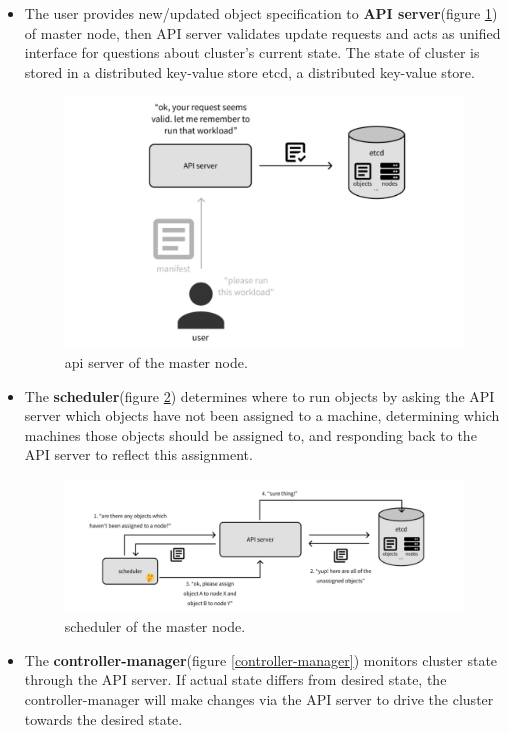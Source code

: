 \begin{itemize}
   \item The user provides new/updated object specification to \textbf{API server}(figure \ref{api-server}) of master node, then API server validates update requests and acts as unified interface for questions about cluster's current state. The state of cluster is stored in a distributed key-value store etcd, a distributed key-value store.
         \begin{figure}[ht]
            \centering
            \includegraphics[width=0.5\linewidth]{images/questions/api-server.png}
            \caption{api server of the master node.}
            \label{api-server}
         \end{figure}
   \item The \textbf{scheduler}(figure \ref{scheduler}) determines where to run objects by asking the API server which objects have not been assigned to a machine, determining which machines those objects should be assigned to, and responding back to the API server to reflect this assignment.
         \begin{figure}[ht]
            \centering
            \includegraphics[width=1\linewidth]{images/questions/scheduler.png}
            \caption{scheduler of the master node.}
            \label{scheduler}
         \end{figure}
   \item The \textbf{controller-manager}(figure \ref{controller-manager}) monitors cluster state through the API server. If actual state differs from desired state, the controller-manager will make changes via the API server to drive the cluster towards the desired state.

\end{itemize}
